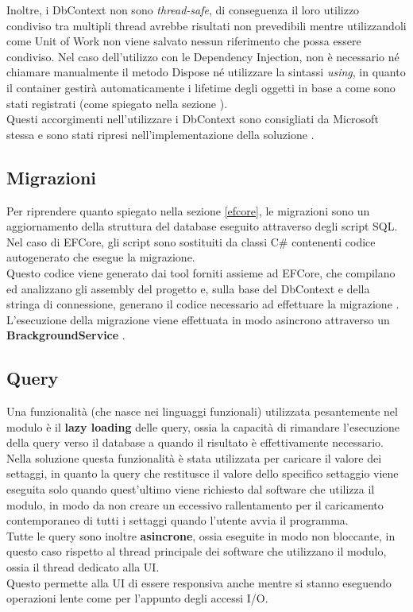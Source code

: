 \documentclass[\main/tesi.tex]{subfiles}
\begin{document}
Inoltre, i DbContext non sono \textit{thread-safe}, di conseguenza il loro utilizzo condiviso tra multipli thread avrebbe risultati non prevedibili mentre utilizzandoli come Unit of Work non viene salvato nessun riferimento che possa essere condiviso.
Nel caso dell'utilizzo con le Dependency Injection, non è necessario né chiamare manualmente il metodo Dispose né utilizzare la sintassi \textit{using}, in quanto il container gestirà automaticamente i lifetime degli oggetti in base a come sono stati registrati (come spiegato nella sezione \cite{ioc}).\\
Questi accorgimenti nell'utilizzare i DbContext sono consigliati da Microsoft stessa e sono stati ripresi nell'implementazione della soluzione \cite{dbcontext}.\\

\subsection{Migrazioni}

Per riprendere quanto spiegato nella sezione \ref{efcore}, le migrazioni sono un aggiornamento della struttura del database eseguito attraverso degli script SQL.\\
Nel caso di EFCore, gli script sono sostituiti da classi C\# contenenti codice autogenerato che esegue la migrazione.\\
Questo codice viene generato dai tool forniti assieme ad EFCore, che compilano ed analizzano gli assembly del progetto e, sulla base del DbContext e della stringa di connessione, generano il codice necessario ad effettuare la migrazione \cite{migrations}.\\
L'esecuzione della migrazione viene effettuata in modo asincrono attraverso un \textbf{BrackgroundService} \cite{backgroundservice}.

\subsection{Query}

Una funzionalità (che nasce nei linguaggi funzionali) utilizzata pesantemente nel modulo è il \textbf{lazy loading} delle query, ossia la capacità di rimandare l'esecuzione della query verso il database a quando il risultato è effettivamente necessario.\\
Nella soluzione questa funzionalità è stata utilizzata per caricare il valore dei settaggi, in quanto la query che restitusce il valore dello specifico settaggio viene eseguita solo quando quest'ultimo viene richiesto dal software che utilizza il modulo, in modo da non creare un eccessivo rallentamento per il caricamento contemporaneo di tutti i settaggi quando l'utente avvia il programma.\\
Tutte le query sono inoltre \textbf{asincrone}, ossia eseguite in modo non bloccante, in questo caso rispetto al thread principale dei software che utilizzano il modulo, ossia il thread dedicato alla UI.\\
Questo permette alla UI di essere responsiva anche mentre si stanno eseguendo operazioni lente come per l'appunto degli accessi I/O.
\end{document}
